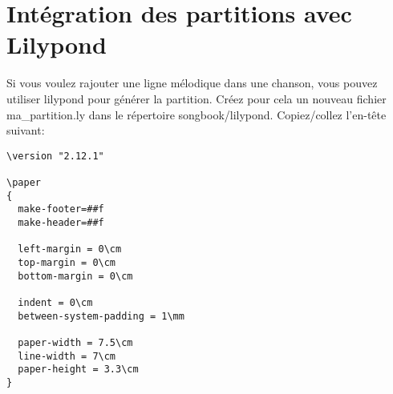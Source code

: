 \documentclass[a4paper,twoside]{article}
\begin{document}
%
%
%
%
%


\section{Intégration des partitions avec Lilypond}

Si vous voulez rajouter une ligne mélodique dans une chanson, vous
pouvez utiliser lilypond pour générer la partition. Créez pour cela un
nouveau fichier ma\_partition.ly dans le répertoire songbook/lilypond.
Copiez/collez l'en-tête suivant:

\begin{verbatim}
\version "2.12.1"

\paper
{
  make-footer=##f
  make-header=##f

  left-margin = 0\cm
  top-margin = 0\cm
  bottom-margin = 0\cm

  indent = 0\cm
  between-system-padding = 1\mm

  paper-width = 7.5\cm
  line-width = 7\cm
  paper-height = 3.3\cm
}
\end{verbatim}
\end{document}
